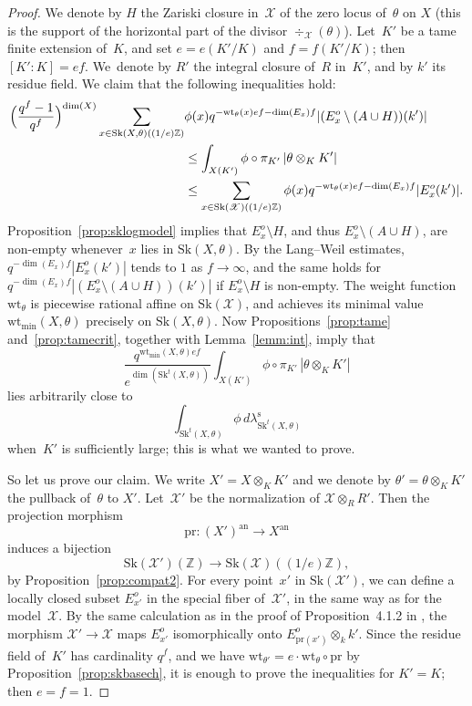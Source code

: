 \documentclass[11pt]{article}
\theoremstyle{definition}
\numberwithin{equation}{subsection}
\newcommand{\Z}{\ensuremath{\mathbb{Z}}}
\newcommand{\cX}{\ensuremath{\mathscr{X}}}
\newcommand{\an}{\mathrm{an}}
\newcommand{\pr}{\mathrm{pr}}
\newcommand{\Sk}{\mathrm{Sk}}
\newcommand{\rs}{\mathrm{s}}
\newcommand{\wt}{\mathrm{wt}}
\let\form\theta
\let\Leb\lambda
\begin{document}
\begin{proof}
We denote by $H$ the Zariski closure in~$\cX$ of the zero locus of~$\form$ on $X$ (this is the support of the horizontal part of the divisor $\div_{\cX}(\form)$).
Let~$K'$ be a tame finite extension of~$K$, and set $e=e(K'/K)$ and $f=f(K'/K)$; then $[K'\colon K]=ef$. We~denote by $R'$ the integral closure of~$R$ in~$K'$, and by $k'$ its residue field.
We claim that the following inequalities hold:
\begin{align*}
\Bigl(\frac{q^f-1}{q^f}\Bigr)^{\dim(X)} \sum_{x\in \Sk(X,\form)((1/e)\Z)}&\phi(x)q^{-\wt_{\form}(x)ef-\dim(E_x)f}|(E_x^o\setminus (A\cup H))(k')|
\\ & \leq \int_{X(K')}\phi\circ\pi_{K'}\,|\form\otimes_K K'|
\\
& \leq \sum_{x\in \Sk(\cX)((1/e)\Z)} \phi(x)q^{-\wt_{\form}(x)ef-\dim(E_x)f}|E_x^o(k')|.
\end{align*}
Proposition~\ref{prop:sklogmodel} implies that
$E^o_x\setminus H$, and thus $E^o_x\setminus (A\cup H)$, are non-empty whenever~$x$ lies in $\Sk(X,\form)$.
By the Lang--Weil estimates, $q^{-\dim(E_x)f}|E_x^o(k')|$ tends to $1$ as $f\to \infty$, and the same holds for $q^{-\dim(E_x)f}|(E_x^o\setminus (A\cup H))(k')|$ if $E_x^o\setminus H$ is non-empty. The weight function $\wt_{\form}$ is piecewise rational affine on $\Sk(\cX)$, and achieves its minimal value $\wt_{\min}(X,\form)$ precisely on $\Sk(X,\form)$.
Now Propositions~\ref{prop:tame} and~\ref{prop:tamecrit}, together with Lemma~\ref{lemm:int}, imply that
\[
\frac{q^{\wt_{\min}(X,\form)ef}}{e^{\dim(\Sk^t(X,\form))}}\int_{X(K')}\phi\circ\pi_{K'}\,|\form\otimes_K K'|
\]
lies arbitrarily close to
\[
\int_{\Sk^t(X,\form)}\phi\,d\Leb^{\rs}_{\Sk^t(X,\form)}
\]
when~$K'$ is sufficiently large; this is what we wanted to prove.

So let us prove our claim. We write $X'=X\otimes_K K'$ and we denote by $\form'=\form \otimes_K K'$ the pullback of~$\form$ to $X'$.
Let~$\cX'$ be the normalization of $\cX\otimes_R R'$. Then the projection morphism
\[
\pr\colon (X')^{\an}\to X^{\an}
\]
induces a bijection
\[
\Sk(\cX')(\Z)\to \Sk(\cX)((1/e)\Z),
\]
by Proposition~\ref{prop:compat2}. For every point~$x'$ in $\Sk(\cX')$, we can define a locally closed subset $E_{x'}^o$ in the special fiber of~$\cX'$, in the same way as for the model~$\cX$.
By the same calculation as in the proof of Proposition~4.1.2 in \cite{logzeta}, the morphism $\cX'\to \cX$
maps $E^o_{x'}$ isomorphically onto $E_{\pr(x')}^o\otimes_k k'$. Since the residue field of~$K'$ has cardinality $q^f$, and
we have $\wt_{\form'}=e\cdot \wt_{\form}\circ \pr$ by Proposition~\ref{prop:skbasech}, it is enough to prove the inequalities for $K'=K$; then $e=f=1$.


\end{proof}
\end{document}
